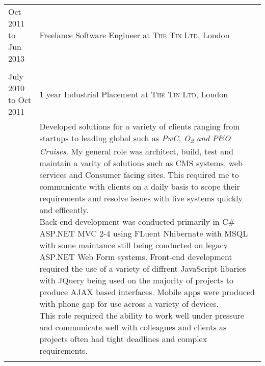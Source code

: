 \documentclass[a4paper,10pt]{article} %
\begin{document}
\begin{tabular}{ L{2cm} | L{11cm}}	
Oct 2011 to Jun 2013 & Freelance Software Engineer at \textsc{The Tin Ltd}, London \\

 \\


July 2010 to Oct 2011 & 1 year Industrial Placement at \textsc{The Tin Ltd}, London \\
& \small{Developed solutions for a variety of clients ranging from startups to leading global such as \textit{PwC, O\textsubscript{2} and P\&O Cruises}. My general role was architect, build, test and maintain a varity of solutions such as CMS systems, web services and Consumer facing sites. This required me to communicate with clients on a daily basis to scope their requirements and resolve issues with live systems quickly and efficently. \newline 
Back-end development was conducted primarily in C\# ASP.NET MVC 2-4 using FLuent Nhibernate with MSQL with some maintance still being conducted on legacy ASP.NET Web Form systems. Front-end development required the use of a variety of diffrent JavaScript libaries with JQuery being used on the majority of projects to produce AJAX based interfaces. Mobile apps were produced with phone gap for use across a variety of devices. \newline
This role required the ability to work well under pressure and communicate well with colleagues and clients as projects often had tight deadlines and complex requirements.


}\\
 \\


%
%
\end{tabular}
\end{document}
